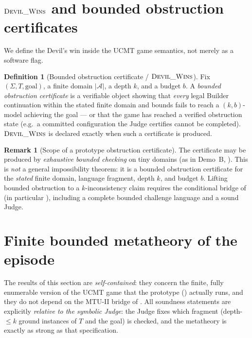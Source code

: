 \documentclass[11pt]{article}
\theoremstyle{definition}
\newtheorem{definition}{Definition}[section]
\newtheorem{remark}{Remark}[section]
\theoremstyle{plain}
\newcommand{\Sig}{\Sigma}
\newcommand{\Thy}{T}
\newcommand{\Struct}{\mathcal{A}}
\newcommand{\Univ}{\left|\Struct\right|}
\begin{document}
\section{$\textsc{Devil\_Wins}$ and bounded obstruction certificates}
\label{sec:devilwins}

We define the Devil's win inside the UCMT game semantics, not merely as a
software flag.

\begin{definition}[Bounded obstruction certificate / $\textsc{Devil\_Wins}$]\label{def:obstruction}
Fix $(\Sig,\Thy,\text{goal})$, a finite domain $\Univ$, a depth $k$, and a budget $b$.
A \emph{bounded obstruction certificate} is a verifiable object showing that
\emph{every} legal Builder continuation within the stated finite domain and bounds
fails to reach a $(k,b)$-model achieving the goal --- or that the game has reached
a verified obstruction state (e.g.\ a committed configuration the Judge certifies
cannot be completed). $\textsc{Devil\_Wins}$ is declared exactly when such a
certificate is produced.
\end{definition}

\begin{remark}[Scope of a prototype obstruction certificate]\label{rem:obstruction-scope}
The certificate may be produced by \emph{exhaustive bounded checking}
on tiny domains (as in Demo~B, ). This is \emph{not} a general impossibility theorem:
it is a bounded obstruction certificate for the \emph{stated} finite domain,
language fragment, depth $k$, and budget $b$. Lifting bounded obstruction to a
$k$-inconsistency claim requires the conditional bridge of
 (in particular ),
including a complete bounded challenge language and a sound Judge.
\end{remark}

\section{Finite bounded metatheory of the episode}
\label{sec:metatheory}

The results of this section are \emph{self-contained}: they concern the finite,
fully enumerable version of the UCMT game that the prototype ()
actually runs, and they do not depend on the MTU-II bridge of
. All soundness statements are explicitly \emph{relative to
the symbolic Judge}: the Judge fixes which fragment (depth-$\le k$ ground instances
of $\Thy$ and the goal) is checked, and the metatheory is exactly as strong as that
specification.
\end{document}
